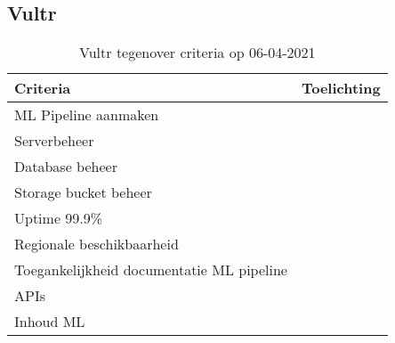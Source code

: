 \subsection*{Vultr}\label{appendix:detailed-overview-of-cloud-computing-platforms:vultr}
\begin{table}[hbt!]
  \centering
  \begin{tabular}{|p{.2\linewidth}|p{.74\linewidth}|}
  \hline
  \textbf{Criteria} & \textbf{Toelichting} \\ \hline
    ML Pipeline \newline aanmaken
    &

    \\ \hline

    Serverbeheer
    &

    \\ \hline

    Database beheer
    &

    \\ \hline

    Storage \newline bucket beheer
    &

    \\ \hline

    Uptime 99.9\%
    &

    \\ \hline

    Regionale \newline beschikbaarheid
    &

    \\ \hline

    Toegankelijkheid documentatie ML pipeline
    &

    \\ \hline

    APIs
    &

    \\ \hline

    Inhoud ML
    &

    \\ \hline
  \end{tabular}
  \caption{Vultr tegenover criteria op 06-04-2021}
  \label{table:vultr-against-criteria}
\end{table}

\newpage

